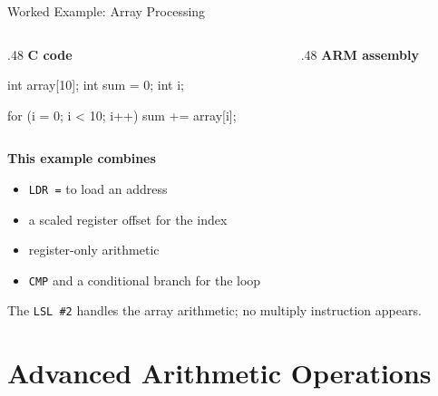 \documentclass[9pt,aspectratio=169,xcolor=table]{beamer}
\begin{document}
\begin{frame}[fragile]{Worked Example: Array Processing}
	\begin{columns}[T]
		\begin{column}{.48\textwidth}
			\textbf{C code}
			\begin{cc}
	int array[10];
	int sum = 0;
	int i;

	for (i = 0; i < 10; i++) {
		sum += array[i];
	}
\end{cc}
		\end{column}
		\begin{column}{.48\textwidth}
			\textbf{ARM assembly}
		\end{column}
	\end{columns}

	\vspace{3mm}
	\textbf{This example combines}
	{\small
		\begin{itemize}\itemsep1pt
			\item \texttt{LDR =} to load an address
			\item a \alert{scaled register offset} for the index
			\item register-only arithmetic
			\item \texttt{CMP} and a conditional branch for the loop
	\end{itemize}}

	\vspace{2mm}
	{\small The \texttt{LSL \#2} handles the array arithmetic;
		no multiply instruction appears.}
\end{frame}


\section{Advanced Arithmetic Operations}
\end{document}
